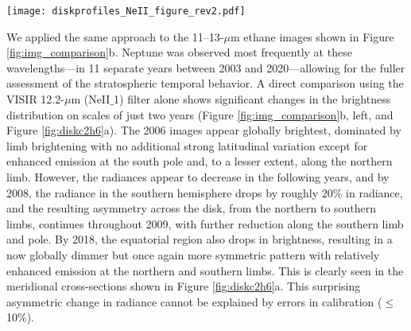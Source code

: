 \documentclass[twocolumn,10pt]{aastex631}
\begin{document}
\begin{figure*}
    \centering
    \texttt{[image: diskprofiles\_NeII\_figure\_rev2.pdf]}
    \caption{As in Fig. \ref{fig:diskh2}, profiles of radiances across the disk, now for 11--13 $\mu$m ethane-sensing images that form the average images shown in Figure \ref{fig:img_comparison}b. a) Profiles from the VISIR NeII$\_$1 (12.2 $\mu$m) images showing the meridional cross-section, the perpendicular cross-sections, and the difference between the profiles (meridional$-$zonal) to help separate latitudinal variation from center-to-limb behavior. For clarity, error bars are omitted but taken to be less than 10\%.  A roughly symmetric meridional profile with enhancement at both southern and northern limbs in 2006 gives way to an asymmetric distribution in 2008--2010 as radiances drop in the southern hemisphere first, before similarly falling at the equatorial latitudes in 2018 to become once again roughly symmetric.  b) Corresponding curves for COMICS F09C12.50W1.15 (12.4 $\mu$m) in 2008 and 2020 showing the most dramatic difference in relative profile among image pairs, with significant brightening at the south pole accompanied by darkening at all other latitudes. c)  Annually averaged curves for all ethane images (11--13$\mu$m, seven separate filters) normalized by their passband-integrated Spitzer radiances and scaled by the corresponding VISIR NeII$\_$1 filter (12.2 $\mu$m) radiance, with uncertainty represented by the fainter envelopes.}
    \label{fig:diskc2h6}
\end{figure*}


We applied the same approach to the 11--13-$\mu$m ethane images shown in Figure \ref{fig:img_comparison}b. Neptune was observed most frequently at these wavelengths---in 11 separate years between 2003 and 2020---allowing for the fuller assessment of the stratospheric temporal behavior. A direct comparison using the VISIR 12.2-$\mu$m (NeII$\_$1) filter alone shows significant changes in the brightness distribution on scales of just two years (Figure \ref{fig:img_comparison}b, left, and Figure \ref{fig:diskc2h6}a). The 2006 images appear globally brightest, dominated by limb brightening with no additional strong latitudinal variation except for enhanced emission at the south pole and, to a lesser extent, along the northern limb. However, the radiances appear to decrease in the following years, and by 2008, the radiance in the southern hemisphere drops by roughly 20\% in radiance, and the resulting asymmetry across the disk, from the northern to southern limbs, continues throughout 2009, with further reduction along the southern limb and pole.  By 2018, the equatorial region also drops in brightness, resulting in a now globally dimmer but once again more symmetric pattern with relatively enhanced emission at the northern and southern limbs. This is clearly seen in the meridional cross-sections shown in Figure \ref{fig:diskc2h6}a. This surprising asymmetric change in radiance cannot be explained by errors in calibration ($\leq$10\%). 
\end{document}
